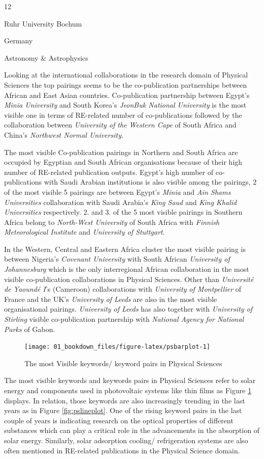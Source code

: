 \documentclass[
]{book}
\begin{document}
{12}

{Ruhr University Bochum }

{Germany }

{Astronomy \& Astrophysics }

Looking at the international collaborations in the research domain of Physical Sciences the top pairings seems to be the co-publication partnerships between African and East Asian countries. Co-publication partnership between Egypt's \emph{Minia University} and South Korea's \emph{JeonBuk National University} is the most visible one in terms of RE-related number of co-publications followed by the collaboration between \emph{University of the Western Cape} of South Africa and China's \emph{Northwest Normal University}.

The most visible Co-publication pairings in Northern and South Africa are occupied by Egyptian and South African organisations because of their high number of RE-related publication outputs. Egypt's high number of co-publications with Saudi Arabian institutions is also visible among the pairings, 2 of the most visible 5 pairings are between Egypt's \emph{Minia} and \emph{Ain Shams Universities} collaboration with Saudi Arabia's \emph{King Saud} and \emph{King Khalid Universities} respectively. 2. and 3. of the 5 most visible pairings in Southern Africa belong to \emph{North-West University} of South Africa with \emph{Finnish Meteorological Institute} and \emph{University of Stuttgart}.

In the Western, Central and Eastern Africa cluster the most visible pairing is between Nigeria's \emph{Covenant University} with South African \emph{University of Johannesburg} which is the only interregional African collaboration in the most visible co-publication collaborations in Physical Sciences. Other than \emph{Université de Yaoundé I}'s (Cameroon) collaborations with \emph{University of Montpellier} of France and the UK's \emph{University of Leeds} are also in the most visible organisational pairings. \emph{University of Leeds} has also together with \emph{University of Stirling} visible co-publication partnership with \emph{National Agency for National Parks} of Gabon.

\begin{figure}
\texttt{[image: 01\_bookdown\_files/figure-latex/psbarplot-1]} \caption{The most Visible keywords/ keyword pairs in Physical Sciences}\label{fig:psbarplot}
\end{figure}

The most visible keywords and keywords pairs in Physical Sciences refer to solar energy and components used in photovoltaic systems like thin films as Figure \ref{fig:psbarplot} displays. In relation, those keywords are also increasingly trending in the last years as in Figure \ref{fig:pslineplot}. One of the rising keyword pairs in the last couple of years is indicating research on the optical properties of different substances which can play a critical role in the advancements in the absorption of solar energy. Similarly, solar adsorption cooling/ refrigeration systems are also often mentioned in RE-related publications in the Physical Science domain.
\end{document}
